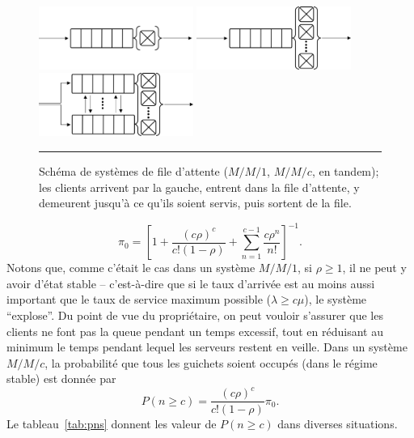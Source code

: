 \begin{figure}[!t]
\centering
\includegraphics[width=0.45\textwidth]{Images/MM12.png}\qquad\qquad 
\includegraphics[width=0.45\textwidth]{Images/MMc.png}\\
\includegraphics[width=0.45\textwidth]{Images/Tandem.png}
\caption{\small Schéma de systèmes de file d'attente ($M/M/1$, $M/M/c$, en tandem); les clients arrivent par la gauche, entrent dans la file d'attente, y demeurent jusqu'à ce qu'ils soient servis, puis sortent de la file.}\label{fig:MM}\hrule
\end{figure}%
$$
\pi_{0} = \left[1 + \frac{\left(c \rho\right)^{c}}{c! \left(1-\rho\right)} + \sum^{c-1}_{n=1} \frac{c \rho^{n}}{n!}\right]^{-1}\!\!. $$
Notons que, comme c'était le cas dans un système $M/M/1$, si $\rho \geq 1$, il ne peut y avoir d'état stable -- c'est-à-dire que si le taux d'arrivée est au moins aussi important que le taux de service maximum possible ($\lambda \geq c \mu$), le système ``explose''. \newl  Du point de vue du propriétaire, on peut vouloir s'assurer que les clients ne font pas la queue pendant un temps excessif, tout en réduisant au minimum le temps pendant lequel les serveurs restent en veille.  Dans un système $M/M/c$, la  probabilité que tous les guichets soient occupés (dans le régime stable) est donnée par 
$$ P( n \geq c) = \frac{\left(c \rho\right)^{c}}{c ! \left(1-\rho\right)} \pi_{0}.$$ 
Le tableau~\ref{tab:pns} donnent les valeur de $P( n \geq c)$ dans diverses situations.  
